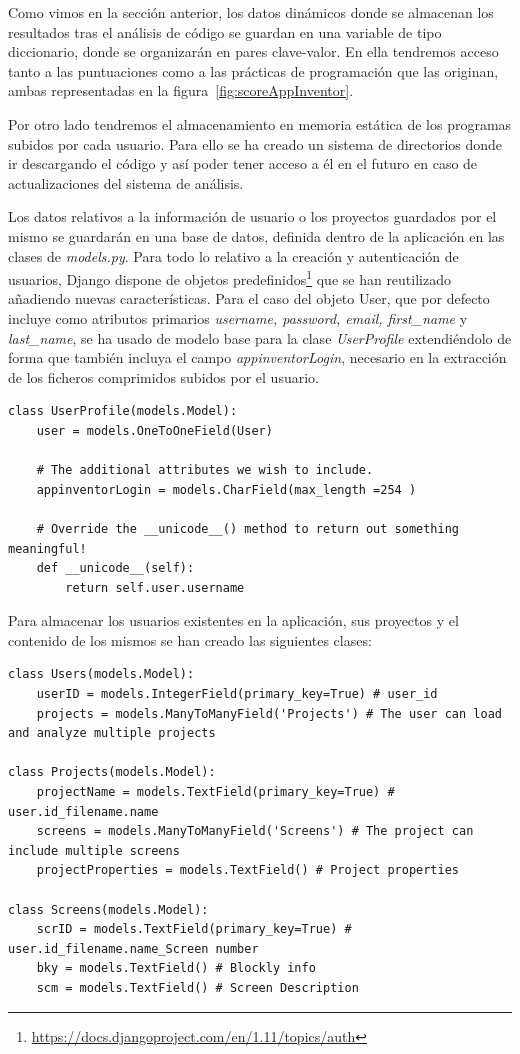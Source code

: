 \documentclass[a4paper, 12pt]{book}
\begin{document}
Como vimos en la sección anterior, los datos dinámicos donde se almacenan los resultados tras el análisis de código se guardan en una variable de tipo diccionario, donde se organizarán en pares clave-valor. En ella tendremos acceso tanto a las puntuaciones como a las prácticas de programación que las originan, ambas representadas en la figura~\ref{fig:scoreAppInventor}.

Por otro lado tendremos el almacenamiento en memoria estática de los programas subidos por cada usuario. Para ello se ha creado un sistema de directorios donde ir descargando el código y así poder tener acceso a él en el futuro en caso de actualizaciones del sistema de análisis. 

Los datos relativos a la información de usuario o los proyectos guardados por el mismo se guardarán en una base de datos, definida dentro de la aplicación en las clases de \textit{models.py}. Para todo lo relativo a la creación y autenticación de usuarios, Django dispone de objetos predefinidos\footnote{\url{https://docs.djangoproject.com/en/1.11/topics/auth}} que se han reutilizado añadiendo nuevas características. Para el caso del objeto User, que por defecto incluye como atributos primarios \textit{username, password, email, first\_name} y \textit{last\_name}, se ha usado de modelo base para la clase \textit{UserProfile} extendiéndolo de forma que también incluya el campo \textit{appinventorLogin}, necesario en la extracción de los ficheros comprimidos subidos por el usuario.
\begin{lstlisting}
class UserProfile(models.Model):
    user = models.OneToOneField(User)

    # The additional attributes we wish to include.
    appinventorLogin = models.CharField(max_length =254 )

    # Override the __unicode__() method to return out something meaningful!
    def __unicode__(self):
        return self.user.username    
\end{lstlisting}
Para almacenar los usuarios existentes en la aplicación, sus proyectos y el contenido de los mismos se han creado las siguientes clases: 
\begin{lstlisting}
class Users(models.Model):
    userID = models.IntegerField(primary_key=True) # user_id
    projects = models.ManyToManyField('Projects') # The user can load and analyze multiple projects

class Projects(models.Model):
    projectName = models.TextField(primary_key=True) # user.id_filename.name
    screens = models.ManyToManyField('Screens') # The project can include multiple screens
    projectProperties = models.TextField() # Project properties
    
class Screens(models.Model):
    scrID = models.TextField(primary_key=True) # user.id_filename.name_Screen number
    bky = models.TextField() # Blockly info
    scm = models.TextField() # Screen Description
\end{lstlisting} 
\end{document}
